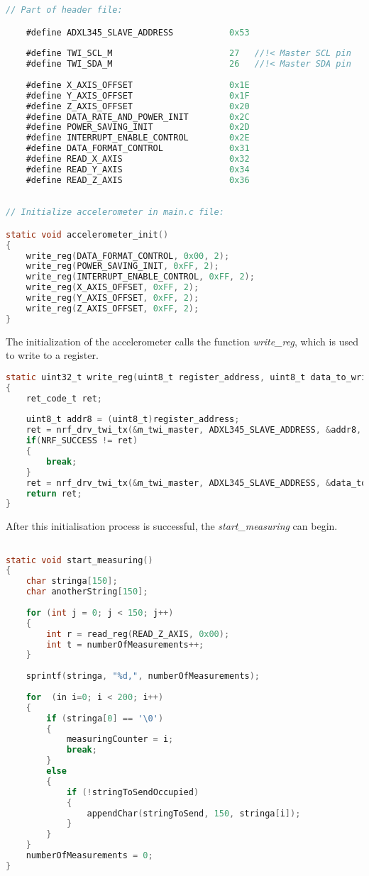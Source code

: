\begin{lstlisting}[language=C]
// Part of header file: 

	#define ADXL345_SLAVE_ADDRESS			0x53
		
    #define TWI_SCL_M						27   //!< Master SCL pin
    #define TWI_SDA_M						26   //!< Master SDA pin
		
	#define X_AXIS_OFFSET					0x1E
	#define Y_AXIS_OFFSET					0x1F
	#define Z_AXIS_OFFSET					0x20
	#define DATA_RATE_AND_POWER_INIT		0x2C
	#define POWER_SAVING_INIT				0x2D
	#define INTERRUPT_ENABLE_CONTROL		0x2E
	#define DATA_FORMAT_CONTROL				0x31
	#define READ_X_AXIS						0x32
	#define READ_Y_AXIS						0x34
	#define READ_Z_AXIS						0x36
\end{lstlisting}
\newpage
\begin{lstlisting}[language=C]

// Initialize accelerometer in main.c file: 

static void accelerometer_init()
{
	write_reg(DATA_FORMAT_CONTROL, 0x00, 2);
	write_reg(POWER_SAVING_INIT, 0xFF, 2);
	write_reg(INTERRUPT_ENABLE_CONTROL, 0xFF, 2);
	write_reg(X_AXIS_OFFSET, 0xFF, 2);
	write_reg(Y_AXIS_OFFSET, 0xFF, 2);
	write_reg(Z_AXIS_OFFSET, 0xFF, 2);	
}

\end{lstlisting}

The initialization of the accelerometer calls the function \textit{write\_reg}, which is used to write to a register. 

\begin{lstlisting}[language=C]
static uint32_t write_reg(uint8_t register_address, uint8_t data_to_write, uint8_t size) 
{		
	ret_code_t ret;
	
    uint8_t addr8 = (uint8_t)register_address;
    ret = nrf_drv_twi_tx(&m_twi_master, ADXL345_SLAVE_ADDRESS, &addr8, 1, true);
    if(NRF_SUCCESS != ret)
    {
        break;
    }
    ret = nrf_drv_twi_tx(&m_twi_master, ADXL345_SLAVE_ADDRESS, &data_to_write, size, false);
    return ret;
}

\end{lstlisting}

After this initialisation process is successful, the \textit{start\_measuring} can begin. 

\begin{lstlisting}[language=C]

static void start_measuring()
{
	char stringa[150];
	char anotherString[150];
	
	for (int j = 0; j < 150; j++)
	{	
		int r = read_reg(READ_Z_AXIS, 0x00);
		int t = numberOfMeasurements++;
	}
	
	sprintf(stringa, "%d,", numberOfMeasurements);
	
	for  (in i=0; i < 200; i++)
	{
		if (stringa[0] == '\0')
		{
			measuringCounter = i;
			break;
		}
		else
		{
			if (!stringToSendOccupied)
			{
				appendChar(stringToSend, 150, stringa[i]);
			}
		}
	}
	numberOfMeasurements = 0; 
}

\end{lstlisting}

